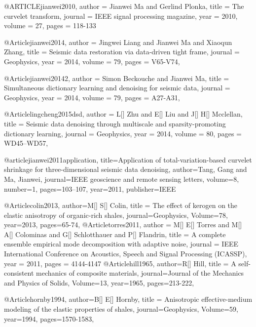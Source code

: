 @ARTICLE{jianwei2010,
  author = {Jianwei Ma and Gerlind Plonka},
  title = {The curvelet transform},
  journal = {IEEE signal processing magazine},
  year = {2010},
  volume = {27},
  pages = {118-133}
}

@Article{jianwei2014,
  author = 	 {Jingwei Liang and Jianwei Ma and Xiaoqun Zhang},
  title = 	 {Seismic data restoration via data-driven tight frame},
  journal = 	 {Geophysics},
  year = 	 2014,
  volume =	 79,
  pages =	 {V65-V74},
}

@Article{jianwei20142,
  author = 	 {Simon Beckouche and Jianwei Ma},
  title = 	 {Simultaneous dictionary learning and denoising for seismic data},
  journal = 	 {Geophysics},
  year = 	 2014,
  volume =	 79,
  pages =	 {A27-A31},
}

@Article{lingcheng2015dsd,
  author = 	 {L[] Zhu and E[] Liu and J[] H[] Mcclellan},
  title = 	 {Seismic data denoising through multiscale and sparsity-promoting dictionary learning},
  journal = 	 {Geophysics},
  year = 	 2014,
  volume =	 80,
  pages =	 {WD45–WD57},
}





@article{jianwei2011application,
  title={Application of total-variation-based curvelet shrinkage for three-dimensional seismic data denoising},
  author={Tang, Gang and Ma, Jianwei},
  journal={IEEE geoscience and remote sensing letters},
  volume={8},
  number={1},
  pages={103--107},
  year={2011},
  publisher={IEEE}
}

@Article{colin2013,
  author={M[] S[] Colin},
  title = {The effect of kerogen on the elastic anisotropy of organic-rich shales},
  journal={Geophysics},
  Volume=78,
  year=2013,
  pages={65-74},
}
@Article{torres2011,
  author = 	 {M[] E[] Torres and M[] A[] Colominas and G[] Schlotthauer and P[] Flandrin},
  title = 	 {A complete ensemble empirical mode decomposition with adaptive noise},
  journal = 	 {IEEE International Conference on Acoustics, Speech and Signal Processing (ICASSP)},
  year = 	 2011,
  pages = 	 {4144-4147}
}
@Article{hill1965,
  author={R[] Hill},
  title = {A self-consistent mechanics of composite materials},
  journal={Journal of the Mechanics and Physics of Solids},
  Volume=13,
  year=1965,
  pages={213-222},
}

@Article{hornby1994,
  author={B[] E[] Hornby},
  title = {Anisotropic effective-medium modeling of the elastic properties of shales},
  journal={Geophysics},
  Volume=59,
  year=1994,
  pages={1570-1583},
}

